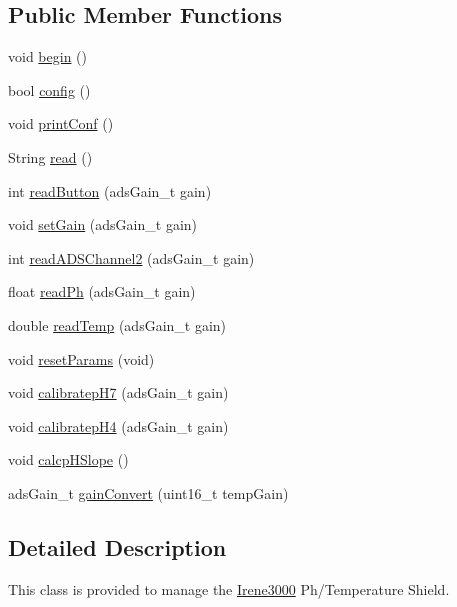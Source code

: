 \subsection*{Public Member Functions}
\begin{DoxyCompactItemize}
\item 
void \hyperlink{class_irene3000_ad5891806c500ae1007afe52b9e304c2b}{begin} ()
\item 
bool \hyperlink{class_irene3000_afed5c35e4b23963c157847ef27c11e9c}{config} ()
\item 
void \hyperlink{class_irene3000_a7bc2414100b5e19eacc6630fa34b2654}{print\+Conf} ()
\item 
String \hyperlink{class_irene3000_a852a170feea994ea1df01c6b245b5d9a}{read} ()
\item 
int \hyperlink{class_irene3000_ae0e0a5b773c3625b44c1d113c76a1540}{read\+Button} (ads\+Gain\+\_\+t gain)
\item 
void \hyperlink{class_irene3000_aff7c5da186b388e7272e63ff88a20c34}{set\+Gain} (ads\+Gain\+\_\+t gain)
\item 
int \hyperlink{class_irene3000_ae73bd2ed14a199a7e83f4d6458476a7c}{read\+A\+D\+S\+Channel2} (ads\+Gain\+\_\+t gain)
\item 
float \hyperlink{class_irene3000_abf3db725fabb0634ec889b32068a5eec}{read\+Ph} (ads\+Gain\+\_\+t gain)
\item 
double \hyperlink{class_irene3000_a94ad40f281d83ad1be20bf1edd6fe802}{read\+Temp} (ads\+Gain\+\_\+t gain)
\item 
void \hyperlink{class_irene3000_a0fba280e8b7c881307efa31281aa691d}{reset\+Params} (void)
\item 
void \hyperlink{class_irene3000_a2e810ddfa8b95eaa2446a408761c6bdc}{calibratep\+H7} (ads\+Gain\+\_\+t gain)
\item 
void \hyperlink{class_irene3000_a9772eeea2305fad6236a82e33e93892e}{calibratep\+H4} (ads\+Gain\+\_\+t gain)
\item 
void \hyperlink{class_irene3000_a81f6a79e546679692053f7ac1af49613}{calcp\+H\+Slope} ()
\item 
ads\+Gain\+\_\+t \hyperlink{class_irene3000_abcad62d1201a59f8dd3ba87048002728}{gain\+Convert} (uint16\+\_\+t temp\+Gain)
\end{DoxyCompactItemize}


\subsection{Detailed Description}
This class is provided to manage the \hyperlink{class_irene3000}{Irene3000} Ph/\+Temperature Shield. 

